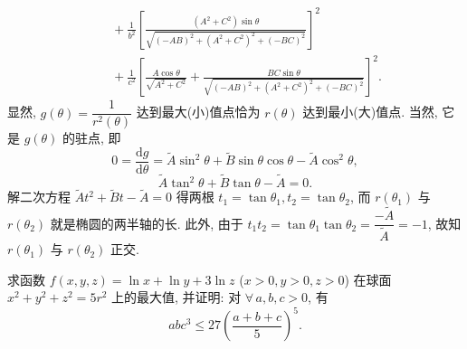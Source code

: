 \begin{solution}
\begin{align*}
  &\quad + \frac{1}{b^{2}}\left[\frac{(A^{2} + C^{2})\sin\theta}{\sqrt{(-AB)^{2} + (A^{2} + C^{2})^{2} + (-BC)^{2}}}\right]^{2} \\
  &\quad + \frac{1}{c^{2}}\left[\frac{A\cos\theta}{\sqrt{A^{2} + C^{2}}} + \frac{BC\sin\theta}{\sqrt{(-AB)^{2} + (A^{2} + C^{2})^{2} + (-BC)^{2}}}\right]^{2}.
\end{align*}
显然, $g(\theta) = \dfrac{1}{r^{2}(\theta)}$ 达到最大(小)值点恰为 $r(\theta)$ 达到最小(大)值点. 当然, 它是 $g(\theta)$ 的驻点, 即
\[
  0 = \frac{\mathrm{d}g}{\mathrm{d}\theta} = \widetilde{A}\sin^{2}\theta + \widetilde{B}\sin\theta\cos\theta - \widetilde{A}\cos^{2}\theta,
\]
\[
  \widetilde{A}\tan^{2}\theta + \widetilde{B}\tan\theta - \widetilde{A} = 0.
\]
解二次方程 $\widetilde{A}t^{2} + \widetilde{B}t - \widetilde{A} = 0$ 得两根 $t_{1} = \tan\theta_{1}, t_{2} = \tan\theta_{2}$, 而 $r(\theta_{1})$ 与 $r(\theta_{2})$ 就是椭圆的两半轴的长. 此外, 由于 $t_{1}t_{2} = \tan\theta_{1}\tan\theta_{2} = \dfrac{-\widetilde{A}}{\widetilde{A}} = -1$, 故知 $r(\theta_{1})$ 与 $r(\theta_{2})$ 正交.
\end{solution}


\begin{example}\label{ex:9.3.4}
求函数 $f(x, y, z) = \ln x + \ln y + 3\ln z$ ($x > 0, y > 0, z > 0$) 在球面 $x^{2} + y^{2} + z^{2} = 5r^{2}$ 上的最大值, 并证明: 对 $\forall\, a, b, c > 0$, 有
\[
  abc^{3} \leqslant 27\left(\frac{a + b + c}{5}\right)^{5}.
\]
\end{example}

